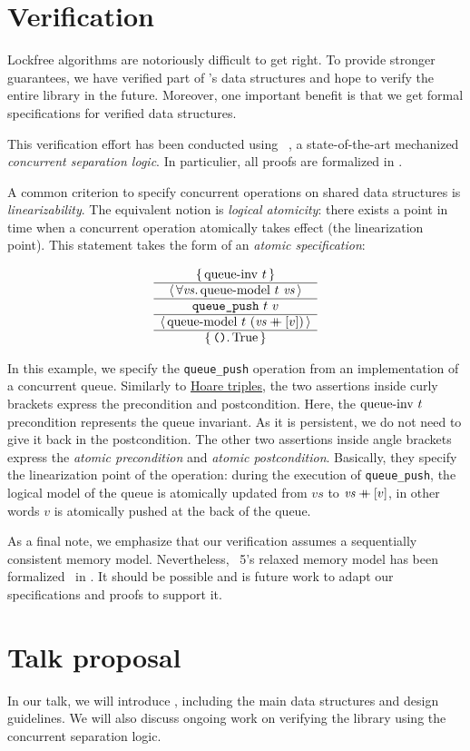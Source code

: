 \documentclass[a4paper, 11pt]{article}
\begin{document}
\section{Verification}

Lockfree algorithms are notoriously difficult to get right.
To provide stronger guarantees, we have verified part of \Saturn's data structures and hope to verify the entire library in the future.
Moreover, one important benefit is that we get formal specifications for verified data structures.

This verification effort has been conducted using \Iris~\cite{DBLP:journals/jfp/JungKJBBD18}, a state-of-the-art mechanized \emph{concurrent separation logic}.
In particulier, all proofs are formalized in \Coq.

A common criterion to specify concurrent operations on shared data structures is \emph{linearizability}.
The equivalent \Iris notion is \emph{logical atomicity}: there exists a point in time when a concurrent operation atomically takes effect (the linearization point).
This statement takes the form of an \emph{atomic specification}:

\[
  \begin{array}{c} \left\lbrace\, 
    \mathrm{queue {\hbox{-}} inv}\ t
   \,\right\rbrace \\ \hline \left\langle\, \forall 
    \mathit{vs}
   \ldotp 
    \mathrm{queue {\hbox{-}} model}\ t\  \mathit{vs}
   \,\right\rangle \\ \hline 
    \texttt{queue\_push}\ t\ v
   \\ \hline \left\langle\, 
    \mathrm{queue {\hbox{-}} model}\ t\  (\mathit{vs} \mathbin{+\mkern-10mu+} [v])
   \,\right\rangle \\ \hline \left\lbrace\, 
    \texttt{()}
   \ldotp 
    \mathrm{True}
   \,\right\rbrace \end{array}
\]

In this example, we specify the \texttt{queue\_push} operation from an implementation of a concurrent queue.
Similarly to \href{https://en.wikipedia.org/wiki/Hoare_logic}{Hoare triples}, the two assertions inside curly brackets express the precondition and postcondition.
Here, the $\mathrm{queue {\hbox{-}} inv}\ t$ precondition represents the queue invariant.
As it is persistent, we do not need to give it back in the postcondition.
The other two assertions inside angle brackets express the \emph{atomic precondition} and \emph{atomic postcondition}.
Basically, they specify the linearization point of the operation: during the execution of \texttt{queue\_push}, the logical model of the queue is atomically updated from $\mathit{vs}$ to $\mathit{vs} \mathbin{+\mkern-10mu+} [v]$, in other words $v$ is atomically pushed at the back of the queue.

As a final note, we emphasize that our verification assumes a sequentially consistent memory model.
Nevertheless, \OCaml~5's relaxed memory model has been formalized~\cite{DBLP:journals/pacmpl/MevelJP20} in \Iris.
It should be possible and is future work to adapt our specifications and proofs to support it.

\section{Talk proposal}

In our talk, we will introduce \Saturn, including the main data structures and design guidelines.
We will also discuss ongoing work on verifying the library using the \Iris concurrent separation logic.

\printbibliography
\end{document}
